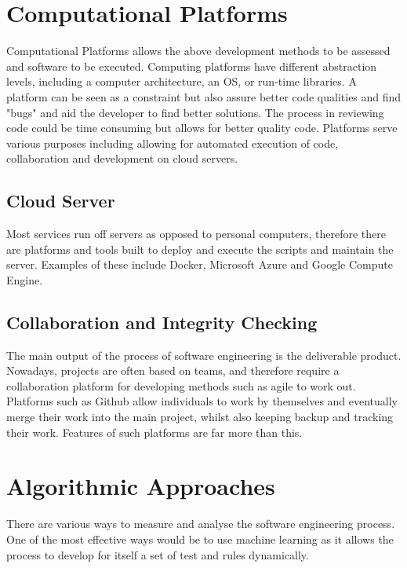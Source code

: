 \documentclass[a4paper]{article}
\begin{document}
{\section{Computational Platforms}
Computational Platforms allows the above development methods to be assessed and software to be executed. Computing platforms have different abstraction levels, including a computer architecture, an OS, or run-time libraries.\autocite{R09} A platform can be seen as a constraint but also assure better code qualities and find "bugs" and aid the developer to find better solutions. The process in reviewing code could be time consuming but allows for better quality code.
\bigbreak
Platforms serve various purposes including allowing for automated execution of code, collaboration and development on cloud servers.

\subsection{Cloud Server}
Most services run off servers as opposed to personal computers, therefore there are platforms and tools built to deploy and execute the scripts and maintain the server. Examples of these include Docker, Microsoft Azure and Google Compute Engine.
\subsection{Collaboration and Integrity Checking}
The main output of the process of software engineering is the deliverable product. Nowadays, projects are often based on teams, and therefore require a collaboration platform for developing methods such as agile to work out. Platforms such as Github allow individuals to work by themselves and eventually merge their work into the main project, whilst also keeping backup and tracking their work. Features of such platforms are far more than this.

\section{Algorithmic Approaches}
There are various ways to measure and analyse the software engineering process. One of the most effective ways would be to use machine learning as it allows the process to develop for itself a set of test and rules dynamically.
\bigbreak
}
\end{document}
